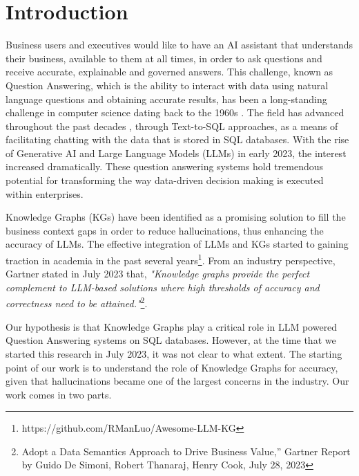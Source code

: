 \documentclass[11pt]{article}
\begin{document}
\section{Introduction}
Business users and executives would like to have an AI assistant that understands their business, available to them at all times, in order to ask questions and receive accurate, explainable and governed answers. 
This challenge, known as Question Answering, which is the ability to interact with data using natural language questions and obtaining accurate results, has been a long-standing challenge in computer science dating back to the 1960s \cite{10.1145/1460690.1460714,10.1145/800186.810578, 10.1145/355598.362773,10.1145/320251.320253}. 
The field has advanced throughout the past decades \cite{data-atis-original,data-geography-original,data-restaurants-logic}, through Text-to-SQL approaches, as a means of facilitating chatting with the data that is stored in SQL databases\cite{data-sql-imdb-yelp,data-academic,data-atis-geography-scholar,data-restaurants-original,data-restaurants,data-wikisql}.
With the rise of Generative AI and Large Language Models (LLMs) in early 2023, the interest increased dramatically. 
These question answering systems hold tremendous potential for transforming the way data-driven decision making is executed within enterprises. 


Knowledge Graphs (KGs) have been identified as a promising solution to fill the business context gaps in order to reduce hallucinations, thus enhancing the accuracy of LLMs. 
The effective integration of LLMs and KGs started to gaining traction in academia in the past several years\footnote{https://github.com/RManLuo/Awesome-LLM-KG}\cite{llm_kg}. 
From an industry perspective, Gartner stated in July 2023 that, \textit{"Knowledge graphs provide the perfect complement to LLM-based solutions where high thresholds of accuracy and correctness need to be attained."}\footnote{Adopt a Data Semantics Approach to Drive Business Value,” Gartner Report by Guido De Simoni, Robert Thanaraj, Henry Cook, July 28, 2023 }.

Our hypothesis is that Knowledge Graphs play a critical role in LLM powered Question Answering systems on SQL databases. 
However, at the time that we started this research in July 2023, it was not clear to what extent.
The starting point of our work is to understand the role of Knowledge Graphs for accuracy, given that hallucinations became one of the largest concerns in the industry. 
Our work comes in two parts. 
\end{document}
